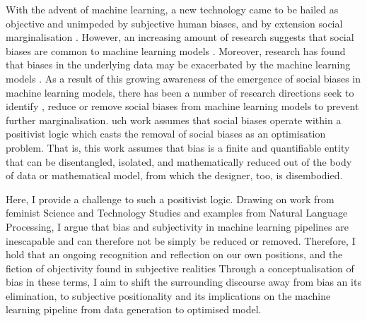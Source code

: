 {With the advent of machine learning, a new technology came to be hailed as objective and unimpeded by subjective human biases, and by extension social marginalisation \citep{oneil:2017}.
However, an increasing amount of research suggests that social biases are common to machine learning models \citep{Shah:2020,Buolamwini:2018,Agarwal:2018}.
Moreover, research has found that biases in the underlying data may be exacerbated by the machine learning models \citep{Zhao:2017,Jia:2020}.
As a result of this growing awareness of the emergence of social biases in machine learning models, there has been a number of research directions seek to identify \citep{Shah:2020,Bender-Friedman:2018,Mitchell:2019,Buolamwini:2018}, reduce or remove social biases \citep{Zhao:2017,Agarwal:2018,Romanov:2019,Jia:2020} from machine learning models to prevent further marginalisation.
uch work assumes that social biases operate within a positivist logic which casts the removal of social biases as an optimisation problem.
That is, this work assumes that bias is a finite and quantifiable entity that can be disentangled, isolated, and mathematically reduced out of the body of data or mathematical model, from which the designer, too, is disembodied.

Here, I provide a challenge to such a positivist logic.
Drawing on work from feminist Science and Technology Studies and examples from Natural Language Processing, I argue that bias and subjectivity in machine learning pipelines are inescapable and can therefore not be simply be reduced or removed.
Therefore, I hold that an ongoing recognition and reflection on our own positions, and the fiction of objectivity found in subjective realities 
Through a conceptualisation of bias in these terms, I aim to shift the surrounding discourse away from bias an its elimination, to  subjective positionality and its implications on the machine learning pipeline from data generation to optimised model.

}
